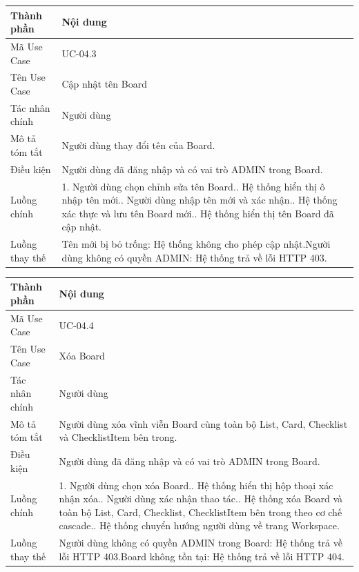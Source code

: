 \vspace{0.5cm}
\noindent\begin{tabular}{|p{3.5cm}|p{10.5cm}|}
\hline
\textbf{Thành phần} & \textbf{Nội dung} \\
\hline
Mã Use Case & UC-04.3 \\
\hline
Tên Use Case & Cập nhật tên Board \\
\hline
Tác nhân chính & Người dùng \\
\hline
Mô tả tóm tắt & Người dùng thay đổi tên của Board. \\
\hline
Điều kiện & Người dùng đã đăng nhập và có vai trò ADMIN trong Board. \\
\hline
Luồng chính & 1. Người dùng chọn chỉnh sửa tên Board.\newline 2. Hệ thống hiển thị ô nhập tên mới.\newline 3. Người dùng nhập tên mới và xác nhận.\newline 4. Hệ thống xác thực và lưu tên Board mới.\newline 5. Hệ thống hiển thị tên Board đã cập nhật. \\
\hline
Luồng thay thế & Tên mới bị bỏ trống: Hệ thống không cho phép cập nhật.\newline Người dùng không có quyền ADMIN: Hệ thống trả về lỗi HTTP 403. \\
\hline
\end{tabular}

\vspace{0.5cm}
\noindent\begin{tabular}{|p{3.5cm}|p{10.5cm}|}
\hline
\textbf{Thành phần} & \textbf{Nội dung} \\
\hline
Mã Use Case & UC-04.4 \\
\hline
Tên Use Case & Xóa Board \\
\hline
Tác nhân chính & Người dùng \\
\hline
Mô tả tóm tắt & Người dùng xóa vĩnh viễn Board cùng toàn bộ List, Card, Checklist và ChecklistItem bên trong. \\
\hline
Điều kiện & Người dùng đã đăng nhập và có vai trò ADMIN trong Board. \\
\hline
Luồng chính & 1. Người dùng chọn xóa Board.\newline 2. Hệ thống hiển thị hộp thoại xác nhận xóa.\newline 3. Người dùng xác nhận thao tác.\newline 4. Hệ thống xóa Board và toàn bộ List, Card, Checklist, ChecklistItem bên trong theo cơ chế cascade.\newline 5. Hệ thống chuyển hướng người dùng về trang Workspace. \\
\hline
Luồng thay thế & Người dùng không có quyền ADMIN trong Board: Hệ thống trả về lỗi HTTP 403.\newline Board không tồn tại: Hệ thống trả về lỗi HTTP 404. \\
\hline
\end{tabular}

